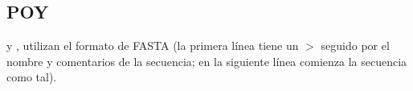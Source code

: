 \subsection{POY}
\noindent
{} y , utilizan el formato de FASTA (la primera l\'inea tiene un 
\begin{math}
>
\end{math}
seguido por el nombre y comentarios de la secuencia; en la siguiente l\'inea comienza la secuencia como tal).

\noindent
{}
